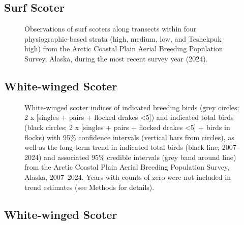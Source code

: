 \documentclass[
]{article}
\begin{document}
\subsection*{Surf Scoter}\label{surf-scoter-2}

\begin{figure}


\caption{\label{fig-SUSCmap}Observations of surf scoters along transects
within four physiographic-based strata (high, medium, low, and Teshekpuk
high) from the Arctic Coastal Plain Aerial Breeding Population Survey,
Alaska, during the most recent survey year (2024).}

\end{figure}%

\newpage{}

\subsection*{White-winged Scoter}\label{white-winged-scoter}

\begin{figure}


\caption{\label{fig-WWSC}White-winged scoter indices of indicated
breeding birds (grey circles; 2 x {[}singles + pairs + flocked drakes
\textless5{]}) and indicated total birds (black circles; 2 x {[}singles
+ pairs + flocked drakes \textless5{]} + birds in flocks) with 95\%
confidence intervals (vertical bars from circles), as well as the
long-term trend in indicated total birds (black line; 2007--2024) and
associated 95\% credible intervals (grey band around line) from the
Arctic Coastal Plain Aerial Breeding Population Survey, Alaska,
2007--2024. Years with counts of zero were not included in trend
estimates (see Methods for details).}

\end{figure}%

\newpage{}

\subsection*{White-winged Scoter}\label{white-winged-scoter-1}
\end{document}
